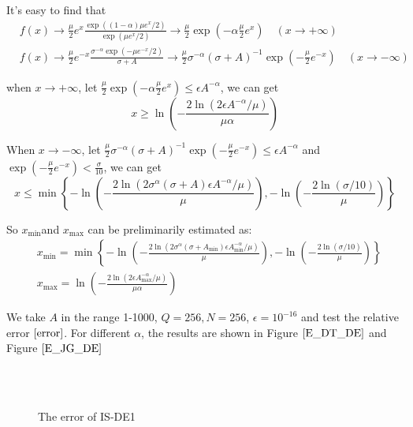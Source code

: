 It's easy to find that
\begin{equation}
\begin{aligned}
& f(x)\rightarrow \frac{\mu}{2}e^x\frac{\exp((1-\alpha)\mu e^x/2)}{\exp(\mu e^x/2)}\rightarrow \frac{\mu}{2}\exp(-\alpha \frac{\mu}{2} e^x)\quad (x \rightarrow +\infty)\\
& f(x)\rightarrow \frac{\mu}{2}e^{-x}\frac{\sigma^{-\alpha}\exp(-\mu e^{-x}/2)}{\sigma+A} \rightarrow \frac{\mu }{2}\sigma^{-\alpha}(\sigma+A)^{-1}\exp(-\frac{\mu}{2}e^{-x})  \quad (x \rightarrow -\infty)
\end{aligned}
\end{equation}

when $x\rightarrow +\infty$, let $\frac{\mu}{2}\exp(-\alpha \frac{\mu}{2} e^x)\leq \epsilon A^{-\alpha}$, we can get
\begin{equation}
x\geq \ln\left(-\frac{2\ln(2\epsilon A^{-\alpha}/\mu)}{\mu \alpha}\right)
\end{equation}

When $x\rightarrow -\infty$, let $\frac{\mu }{2}\sigma^{-\alpha}(\sigma+A)^{-1}\exp(-\frac{\mu}{2}e^{-x}) \leq \epsilon A^{-\alpha}$ and $\exp(-\frac{\mu}{2}e^{-x})< \frac{\sigma}{10}$, we can get
\begin{equation}
x\leq \min \left\{-\ln\left(-\frac{2\ln(2\sigma^{\alpha}(\sigma+A)\epsilon A^{-\alpha}/\mu)}{\mu}\right),-\ln\left(-\frac{2\ln(\sigma/10)}{\mu}\right) \right\}
\end{equation}

So  $x_{\min}$and $x_{\max}$ can be preliminarily estimated as:
\begin{equation}\begin{aligned}&x_{\min}=\min \left\{-\ln\left(-\frac{2\ln(2\sigma^{\alpha}(\sigma+A_{\min})\epsilon A_{\min}^{-\alpha}/\mu)}{\mu}\right),-\ln\left(-\frac{2\ln(\sigma/10)}{\mu}\right) \right\}
\\&x_{\max}=\ln\left(-\frac{2\ln(2\epsilon A_{\max}^{-\alpha}/\mu)}{\mu \alpha}\right)
\end{aligned}\end{equation}

We take $A$ in the range 1-1000, $Q=256, N=256$,  $\epsilon=10^{-16}$ and test the relative error $\eqref{error}$. For different $\alpha $, the results are shown in Figure $\ref{E_DT_DE}$ and Figure $\ref{E_JG_DE}$

\begin{figure}[htbp]
\centering
{}
~~
~~
\\
~~
~~
  \caption{The error of IS-DE1}
  \label{E_DT_DE}
\end{figure}


